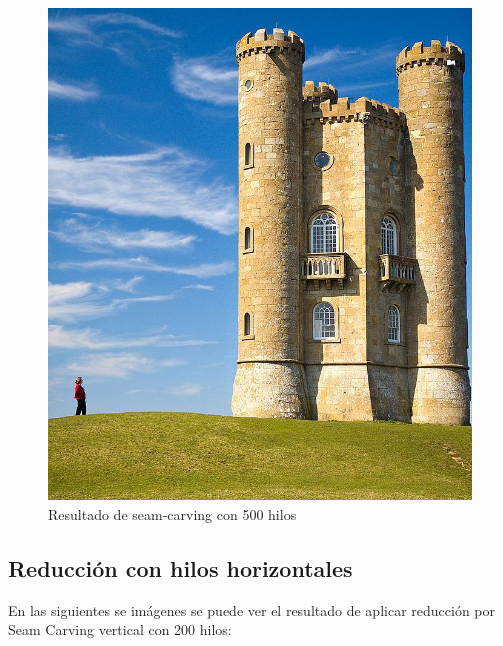 \documentclass[12pt,a4paper,oneside]{article}
\begin{document}
\begin{figure}[!htb]
      \includegraphics[width=\linewidth]{500-reduction.jpg}
      \caption{Resultado de seam-carving con 500 hilos}\label{broadwayseam}
    \endminipage
\end{figure}

\subsection{Reducción con hilos horizontales}
En las siguientes se imágenes se puede ver el resultado de aplicar reducción por 
Seam Carving vertical con 200 hilos:
\end{document}
